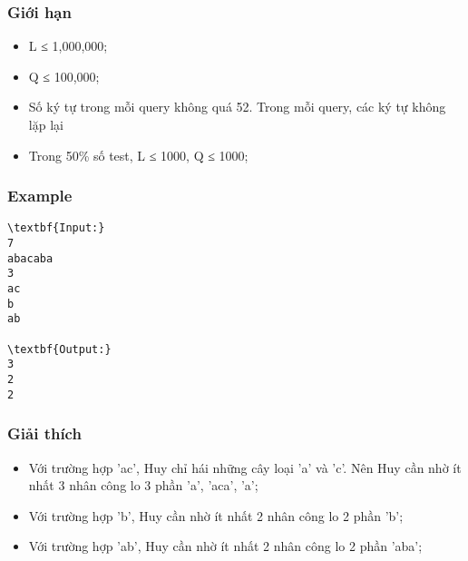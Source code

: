 \subsubsection{Giới hạn}
\begin{itemize}
	\item L ≤ 1,000,000;
	\item Q ≤ 100,000;
	\item Số ký tự trong mỗi query không quá 52. Trong mỗi query, các ký tự không lặp lại
	\item Trong 50\% số test, L ≤ 1000, Q ≤ 1000;
\end{itemize}

\subsubsection{Example}
\begin{verbatim}
\textbf{Input:}
7
abacaba
3
ac
b
ab

\textbf{Output:}
3
2
2
\end{verbatim}

\subsubsection{Giải thích}
\begin{itemize}
	\item Với trường hợp 'ac', Huy chỉ hái những cây loại 'a' và 'c'. Nên Huy cần nhờ ít nhất 3 nhân công lo 3 phần 'a', 'aca', 'a';
	\item Với trường hợp 'b', Huy cần nhờ ít nhất 2 nhân công lo 2 phần 'b';
	\item Với trường hợp 'ab', Huy cần nhờ ít nhất 2 nhân công lo 2 phần 'aba';
\end{itemize}